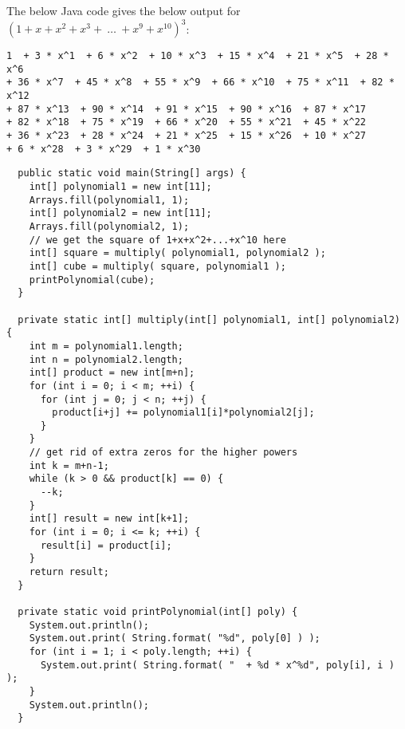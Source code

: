 \documentclass[12pt]{article}
\begin{document}
The below Java code gives the below output for $\left( 1+x+x^2+x^3+\ \ldots\ +x^9+x^{10} \right)^3$:

\begin{verbatim}
1  + 3 * x^1  + 6 * x^2  + 10 * x^3  + 15 * x^4  + 21 * x^5  + 28 * x^6  
+ 36 * x^7  + 45 * x^8  + 55 * x^9  + 66 * x^10  + 75 * x^11  + 82 * x^12  
+ 87 * x^13  + 90 * x^14  + 91 * x^15  + 90 * x^16  + 87 * x^17  
+ 82 * x^18  + 75 * x^19  + 66 * x^20  + 55 * x^21  + 45 * x^22  
+ 36 * x^23  + 28 * x^24  + 21 * x^25  + 15 * x^26  + 10 * x^27  
+ 6 * x^28  + 3 * x^29  + 1 * x^30
\end{verbatim}


\begin{verbatim}
  public static void main(String[] args) {
    int[] polynomial1 = new int[11];
    Arrays.fill(polynomial1, 1); 
    int[] polynomial2 = new int[11];
    Arrays.fill(polynomial2, 1);
    // we get the square of 1+x+x^2+...+x^10 here
    int[] square = multiply( polynomial1, polynomial2 );
    int[] cube = multiply( square, polynomial1 );
    printPolynomial(cube);
  }
  
  private static int[] multiply(int[] polynomial1, int[] polynomial2) {
    int m = polynomial1.length;
    int n = polynomial2.length;
    int[] product = new int[m+n];
    for (int i = 0; i < m; ++i) {
      for (int j = 0; j < n; ++j) {
        product[i+j] += polynomial1[i]*polynomial2[j];
      }
    }
    // get rid of extra zeros for the higher powers
    int k = m+n-1;
    while (k > 0 && product[k] == 0) {
      --k;
    }    
    int[] result = new int[k+1];
    for (int i = 0; i <= k; ++i) {
      result[i] = product[i];
    }   
    return result;
  }
  
  private static void printPolynomial(int[] poly) {
    System.out.println();
    System.out.print( String.format( "%d", poly[0] ) );
    for (int i = 1; i < poly.length; ++i) {
      System.out.print( String.format( "  + %d * x^%d", poly[i], i ) );
    }
    System.out.println();
  }
\end{verbatim}
\end{document}
